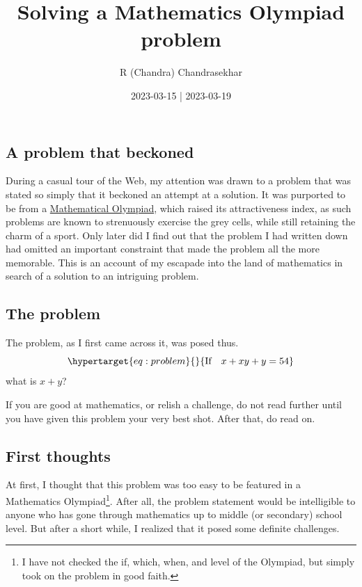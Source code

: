 \documentclass[
  a4paper,
]{article}
\title{Solving a Mathematics Olympiad problem}
\author{R (Chandra) Chandrasekhar}
\date{2023-03-15 | 2023-03-19}
\begin{document}
\maketitle

\thispagestyle{empty}


\hypertarget{a-problem-that-beckoned}{%
\subsection{A problem that beckoned}\label{a-problem-that-beckoned}}

During a casual tour of the Web, my attention was drawn to a problem
that was stated so simply that it beckoned an attempt at a solution. It
was purported to be from a
\href{https://www.imo-official.org/}{Mathematical Olympiad}, which
raised its attractiveness index, as such problems are known to
strenuously exercise the grey cells, while still retaining the charm of
a sport. Only later did I find out that the problem I had written down
had omitted an important constraint that made the problem all the more
memorable. This is an account of my escapade into the land of
mathematics in search of a solution to an intriguing problem.

\hypertarget{the-problem}{%
\subsection{The problem}\label{the-problem}}

The problem, as I first came across it, was posed thus.
\begin{equation}\protect\hypertarget{eq:problem}{}{
\text{If}\quad
x + xy + y = 54
}\label{eq:problem}\end{equation} what is \(x + y\)?

If you are good at mathematics, or relish a challenge, do not read
further until you have given this problem your very best shot. After
that, do read on.

\hypertarget{first-thoughts}{%
\subsection{First thoughts}\label{first-thoughts}}

At first, I thought that this problem was too easy to be featured in a
Mathematics Olympiad\footnote{I have not checked the if, which, when,
  and level of the Olympiad, but simply took on the problem in good
  faith.}. After all, the problem statement would be intelligible to
anyone who has gone through mathematics up to middle (or secondary)
school level. But after a short while, I realized that it posed some
definite challenges.
\end{document}
